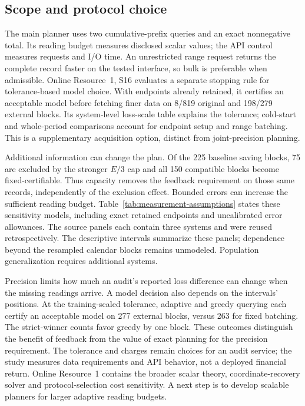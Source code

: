 \documentclass[12pt]{article}
\begin{document}
\subsection{Scope and protocol choice}
The main planner uses two cumulative-prefix queries and an exact
nonnegative total. Its reading budget measures disclosed scalar values;
the API control measures requests and I/O time. An unrestricted range
request returns the complete record faster on the tested interface, so
bulk is preferable when admissible. Online Resource~1, S16 evaluates a
separate stopping rule for tolerance-based model choice. With endpoints
already retained, it certifies an acceptable model before fetching finer
data on 8/819 original and 198/279 external blocks. Its system-level
loss-scale table explains the tolerance; cold-start and whole-period
comparisons account for endpoint setup and range batching. This is a
supplementary acquisition option, distinct from joint-precision planning.

Additional information can change the plan. Of the 225 baseline saving
blocks, 75 are excluded by the stronger $E/3$ cap and all 150 compatible
blocks become fixed-certifiable. Thus capacity removes the feedback
requirement on those same records, independently of the exclusion effect.
Bounded errors can increase the sufficient reading budget.
Table~\ref{tab:measurement-assumptions} states these sensitivity models,
including exact retained endpoints and uncalibrated error allowances.
The source panels each contain three systems and were reused retrospectively.
The descriptive intervals summarize these panels; dependence beyond the
resampled calendar blocks remains unmodeled. Population generalization
requires additional systems.

Precision limits how much an audit's reported loss difference can change
when the missing readings arrive. A model decision also depends on the
intervals' positions. At the training-scaled tolerance, adaptive and greedy
querying each certify an acceptable model on 277 external blocks, versus
263 for fixed batching. The strict-winner counts favor greedy by one block.
These outcomes distinguish the benefit
of feedback from the value of exact planning for the precision requirement.
The tolerance and charges remain choices for an audit service; the study
measures data requirements and API behavior, not a deployed financial return.
Online Resource~1 contains the
broader scalar theory, coordinate-recovery solver and protocol-selection
cost sensitivity. A next step is to develop scalable planners for larger
adaptive reading budgets.
\end{document}
